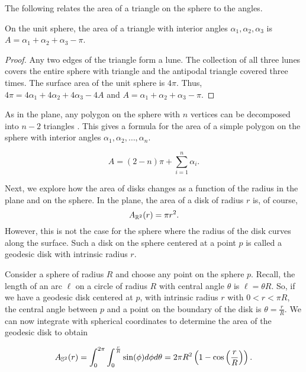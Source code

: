 The following relates the area of a triangle on the sphere to the angles.

\begin{lemma}\label{lem:spherical-triangle}
On the unit sphere, the area of a triangle with interior angles $\alpha_1, \alpha_2, \alpha_3$
is $A=\alpha_1+\alpha_2+\alpha_3-\pi$.
\end{lemma}

\begin{proof}
	Any two edges of the triangle form a lune. The collection of 
	all three lunes covers the entire sphere with triangle and the antipodal triangle covered three times.
 	The surface area of the unit sphere is $4\pi$.
	Thus, $4\pi=4\alpha_1+4\alpha_2+4\alpha_3-4A$
	and $A=\alpha_1+\alpha_2+\alpha_3-\pi$.
	
\end{proof}

As in the plane, any polygon on the sphere with $n$ vertices can be decomposed
into $n-2$ triangles \cite{orourke_computational_1994}. This gives a formula for the area of a simple polygon
on the sphere with interior angles $\alpha_1,\alpha_2,\ldots, \alpha_n$.

\begin{equation} \label{eqn:sphere-area}
	A=(2-n)\pi +\sum_{i=1}^n \alpha_i.
\end{equation}


Next, we explore how the area of disks changes as a function 
of the radius in the plane and on the sphere. 
In the plane, the area of a disk of radius $r$ is, of course,
$$A_{\mathbb{R}^2}(r)=\pi r^2.$$ However, this is not the case for the sphere where
the radius of the disk curves along the surface. Such a disk on the sphere
centered at a point $p$
is called a geodesic disk with intrinsic radius $r$.

Consider a sphere of radius $R$ and choose any point on the sphere $p.$
Recall, the length of an arc $\ell$ on a circle of radius $R$ with central angle $\theta$
is $\ell=\theta R.$ So, if we have a geodesic disk centered at $p$, with intrinsic radius $r$ with
$0<r<\pi R$,
the central angle between $p$ and a point on the boundary of the disk is 
$\theta=\frac{r}{R}.$ We can now integrate with spherical coordinates 
to determine the area of the geodesic disk to obtain

\begin{equation} \label{eqn:sphere-disk-area}
	A_{\mathbb{S}^2}(r)=\int_0^{2\pi}\int_0^{\frac{r}{R}}\sin(\phi)d\phi d\theta = 2\pi R^2\left(1-\cos\left(\frac{r}{R}\right)\right).
\end{equation}

